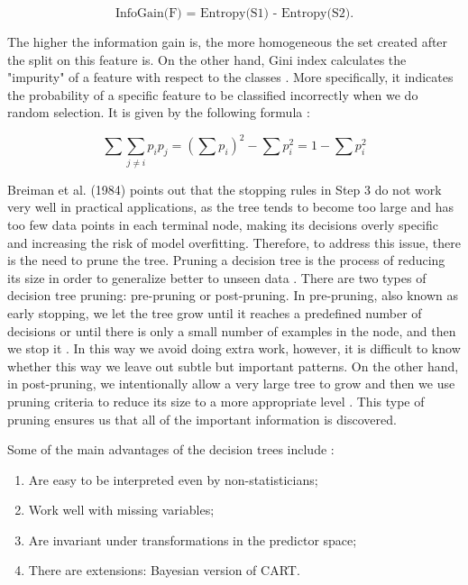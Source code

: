 \documentclass{usiinftr}
\begin{document}
\begin{equation}
\text{InfoGain(F) = Entropy(S1) - Entropy(S2).}
\end{equation}

The higher the information gain is, the more homogeneous the set created after the split on this feature is. On the other hand, Gini index calculates the "impurity" of a feature with respect to the classes \cite{5}. More specifically, it indicates the probability of a specific feature to be classified incorrectly when we do random selection. It is given by the following formula \cite{5}:

\begin{equation}
\sum \sum_{j \neq i} p_{i} p_{j}=\left(\sum p_{i}\right)^{2}-\sum p_{i}^{2}=1-\sum p_{i}^{2}
\end{equation}

Breiman et al. (1984) points out that the stopping rules in Step 3 do not work very well in practical applications, as the tree tends to become too large and has too few data points in each terminal node, making its decisions overly specific and increasing the risk of model overfitting. Therefore, to address this issue, there is the need to prune the tree. Pruning a decision tree is the process of reducing its size in order to generalize better to unseen data \cite{4}. There are two types of decision tree pruning: pre-pruning or post-pruning. In pre-pruning, also known as early stopping, we let the tree grow until it reaches a predefined number of decisions or until there is only a small number of examples in the node, and then we stop it \cite{4}. In this way we avoid doing extra work, however, it is difficult to know whether this way we leave out subtle but important patterns. On the other hand, in post-pruning, we intentionally allow a very large tree to grow and then we use pruning criteria to reduce its size to a more appropriate level \cite{4}. This type of pruning ensures us that all of the important information is discovered. 
	
Some of the main advantages of the decision trees include \cite{4}:
\begin{enumerate}
\item Are easy to be interpreted even by non-statisticians;
\item Work well with missing variables;
\item Are invariant under transformations in the predictor space;
\item There are extensions: Bayesian version of CART.
\end{enumerate}
\end{document}
